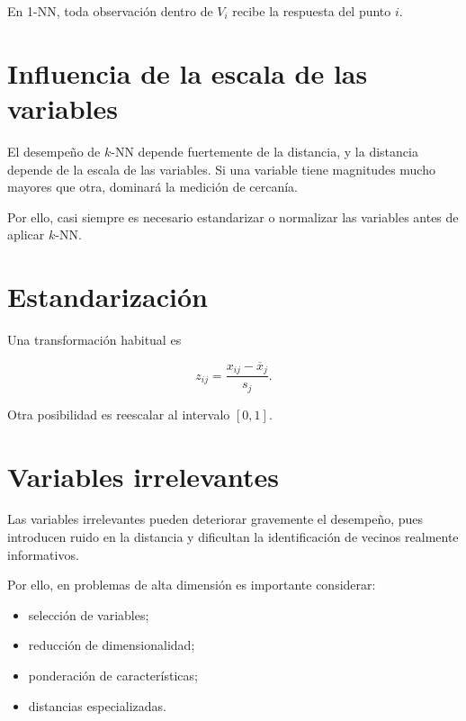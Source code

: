 \documentclass[
  spanish,
  10.5pt,
  letterpaper,
  DIV=11,
  numbers=noendperiod,
  oneside,
  open=any]{scrreprt}
\providecommand{\tightlist}{%
  \setlength{\itemsep}{0pt}\setlength{\parskip}{0pt}}
\theoremstyle{definition}
\theoremstyle{definition}
\theoremstyle{plain}
\theoremstyle{remark}
\begin{document}
En 1-NN, toda observación dentro de \(V_i\) recibe la respuesta del
punto \(i\).

\section*{Influencia de la escala de las
variables}\label{influencia-de-la-escala-de-las-variables}


El desempeño de \(k\)-NN depende fuertemente de la distancia, y la
distancia depende de la escala de las variables. Si una variable tiene
magnitudes mucho mayores que otra, dominará la medición de cercanía.

Por ello, casi siempre es necesario estandarizar o normalizar las
variables antes de aplicar \(k\)-NN.

\section*{Estandarización}\label{estandarizaciuxf3n-1}


Una transformación habitual es

\[
z_{ij}
=
\frac{x_{ij}-\overline{x}_j}{s_j}.
\]

Otra posibilidad es reescalar al intervalo \([0,1]\).

\section*{Variables irrelevantes}\label{variables-irrelevantes}


Las variables irrelevantes pueden deteriorar gravemente el desempeño,
pues introducen ruido en la distancia y dificultan la identificación de
vecinos realmente informativos.

Por ello, en problemas de alta dimensión es importante considerar:

\begin{itemize}
\tightlist
\item
  selección de variables;
\item
  reducción de dimensionalidad;
\item
  ponderación de características;
\item
  distancias especializadas.
\end{itemize}
\end{document}
